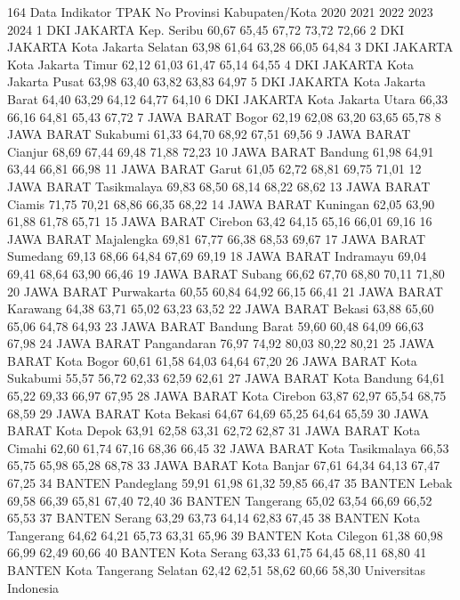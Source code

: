 164
Data Indikator TPAK
No Provinsi Kabupaten/Kota 2020 2021 2022 2023 2024
1 DKI JAKARTA Kep. Seribu 60,67 65,45 67,72 73,72 72,66
2 DKI JAKARTA Kota Jakarta Selatan 63,98 61,64 63,28 66,05 64,84
3 DKI JAKARTA Kota Jakarta Timur 62,12 61,03 61,47 65,14 64,55
4 DKI JAKARTA Kota Jakarta Pusat 63,98 63,40 63,82 63,83 64,97
5 DKI JAKARTA Kota Jakarta Barat 64,40 63,29 64,12 64,77 64,10
6 DKI JAKARTA Kota Jakarta Utara 66,33 66,16 64,81 65,43 67,72
7 JAWA BARAT Bogor 62,19 62,08 63,20 63,65 65,78
8 JAWA BARAT Sukabumi 61,33 64,70 68,92 67,51 69,56
9 JAWA BARAT Cianjur 68,69 67,44 69,48 71,88 72,23
10 JAWA BARAT Bandung 61,98 64,91 63,44 66,81 66,98
11 JAWA BARAT Garut 61,05 62,72 68,81 69,75 71,01
12 JAWA BARAT Tasikmalaya 69,83 68,50 68,14 68,22 68,62
13 JAWA BARAT Ciamis 71,75 70,21 68,86 66,35 68,22
14 JAWA BARAT Kuningan 62,05 63,90 61,88 61,78 65,71
15 JAWA BARAT Cirebon 63,42 64,15 65,16 66,01 69,16
16 JAWA BARAT Majalengka 69,81 67,77 66,38 68,53 69,67
17 JAWA BARAT Sumedang 69,13 68,66 64,84 67,69 69,19
18 JAWA BARAT Indramayu 69,04 69,41 68,64 63,90 66,46
19 JAWA BARAT Subang 66,62 67,70 68,80 70,11 71,80
20 JAWA BARAT Purwakarta 60,55 60,84 64,92 66,15 66,41
21 JAWA BARAT Karawang 64,38 63,71 65,02 63,23 63,52
22 JAWA BARAT Bekasi 63,88 65,60 65,06 64,78 64,93
23 JAWA BARAT Bandung Barat 59,60 60,48 64,09 66,63 67,98
24 JAWA BARAT Pangandaran 76,97 74,92 80,03 80,22 80,21
25 JAWA BARAT Kota Bogor 60,61 61,58 64,03 64,64 67,20
26 JAWA BARAT Kota Sukabumi 55,57 56,72 62,33 62,59 62,61
27 JAWA BARAT Kota Bandung 64,61 65,22 69,33 66,97 67,95
28 JAWA BARAT Kota Cirebon 63,87 62,97 65,54 68,75 68,59
29 JAWA BARAT Kota Bekasi 64,67 64,69 65,25 64,64 65,59
30 JAWA BARAT Kota Depok 63,91 62,58 63,31 62,72 62,87
31 JAWA BARAT Kota Cimahi 62,60 61,74 67,16 68,36 66,45
32 JAWA BARAT Kota Tasikmalaya 66,53 65,75 65,98 65,28 68,78
33 JAWA BARAT Kota Banjar 67,61 64,34 64,13 67,47 67,25
34 BANTEN Pandeglang 59,91 61,98 61,32 59,85 66,47
35 BANTEN Lebak 69,58 66,39 65,81 67,40 72,40
36 BANTEN Tangerang 65,02 63,54 66,69 66,52 65,53
37 BANTEN Serang 63,29 63,73 64,14 62,83 67,45
38 BANTEN Kota Tangerang 64,62 64,21 65,73 63,31 65,96
39 BANTEN Kota Cilegon 61,38 60,98 66,99 62,49 60,66
40 BANTEN Kota Serang 63,33 61,75 64,45 68,11 68,80
41 BANTEN Kota Tangerang Selatan 62,42 62,51 58,62 60,66 58,30
Universitas Indonesia

